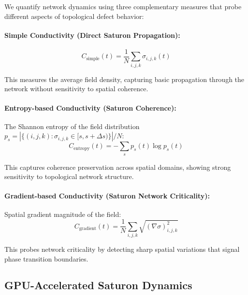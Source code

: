 We quantify \saturon{} network dynamics using three complementary measures 
that probe different aspects of topological defect behavior:

\paragraph{Simple Conductivity (Direct Saturon Propagation):}
\begin{equation}
C_{\text{simple}}(t) = \frac{1}{N}\sum_{i,j,k} \sigma_{i,j,k}(t)
\label{eq:simple}
\end{equation}

This measures the average \saturon{} field density, capturing basic propagation 
through the network without sensitivity to spatial coherence.

\paragraph{Entropy-based Conductivity (Saturon Coherence):}
The Shannon entropy of the \saturon{} field distribution $p_s = |\{(i,j,k): \sigma_{i,j,k} \in [s, s+\Delta s)\}|/N$:
\begin{equation}
C_{\text{entropy}}(t) = -\sum_{s} p_s(t) \log p_s(t)
\label{eq:entropy}
\end{equation}

This captures \saturon{} coherence preservation across spatial domains, 
showing strong sensitivity to topological network structure.

\paragraph{Gradient-based Conductivity (Saturon Network Criticality):}
Spatial gradient magnitude of the \saturon{} field:
\begin{equation}
C_{\text{gradient}}(t) = \frac{1}{N}\sum_{i,j,k} \sqrt{(\nabla \sigma)_{i,j,k}^2}
\label{eq:gradient}
\end{equation}

This probes \saturon{} network criticality by detecting sharp spatial variations 
that signal phase transition boundaries.

\subsection{GPU-Accelerated Saturon Dynamics}

